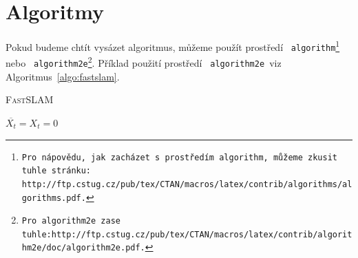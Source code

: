 \documentclass[a4paper, 11pt]{article}
\begin{document}
\bigskip


\pagebreak

 
\section{Algoritmy}

\label{section:algoritmy}
Pokud budeme chtít vysázet algoritmus, můžeme použít prostředí \texttt{ algorithm\footnote{Pro nápovědu, jak zacházet s~prostředím\texttt{ algorithm,} můžeme zkusit tuhle stránku: \\http://ftp.cstug.cz/pub/tex/CTAN/macros/latex/contrib/algorithms/algorithms.pdf.} } nebo \texttt{ algorithm2e\footnote{Pro\texttt{ algorithm2e }zase tuhle:http://ftp.cstug.cz/pub/tex/CTAN/macros/latex/contrib/algorithm2e/doc/algorithm2e.pdf.}}.
Příklad použití prostředí \texttt{ algorithm2e }viz Algoritmus~\ref{algo:fastslam}.


\IncMargin{1.5em}
\begin{algorithm}

    \label{algo:fastslam}
    \caption{\textsc{FastSLAM}}

    \SetNlSty{}{}{:}

    \Indm\Indmm
    \Indp\Indpp

    \BlankLine

    $ \overline{X_t} = X_t = 0 $ \\




\end{algorithm}
\end{document}
